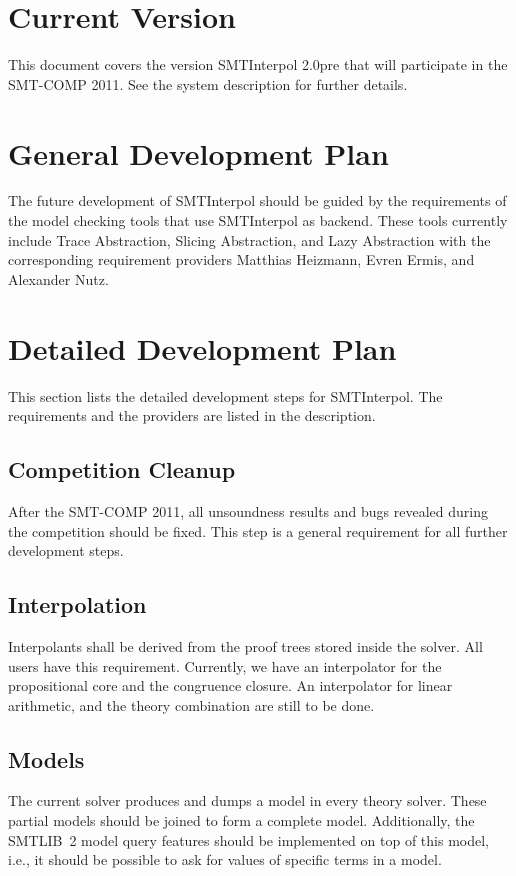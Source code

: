 \documentclass{article}
\title{\SI\ - Development Plan}
\author{J\"urgen Christ, Jochen Hoenicke\\
  University of Freiburg\\
  \texttt{\{christj,hoenicke\}@informatik.uni-freiburg.de}}
\newcommand\SI{SMTInterpol\xspace}
\newcommand\version{2.0pre\xspace}
\begin{document}
\maketitle
\section{Current Version}
This document covers the version \SI \version that will participate in the
SMT-COMP 2011.  See the system description for further details.

\section{General Development Plan}
The future development of \SI should be guided by the requirements of the
model checking tools that use \SI as backend.  These tools currently include
Trace Abstraction, Slicing Abstraction, and Lazy Abstraction with the
corresponding requirement providers Matthias Heizmann, Evren Ermis, and
Alexander Nutz.

\section{Detailed Development Plan}
This section lists the detailed development steps for \SI.  The requirements
and the providers are listed in the description.

\subsection{Competition Cleanup}
After the SMT-COMP 2011, all unsoundness results and bugs revealed during the
competition should be fixed.  This step is a general requirement for all
further development steps.

\subsection{Interpolation}
Interpolants shall be derived from the proof trees stored inside the solver.
All users have this requirement.  Currently, we have an interpolator for the
propositional core and the congruence closure.  An interpolator for linear
arithmetic, and the theory combination are still to be done.

\subsection{Models}
The current solver produces and dumps a model in every theory solver.  These
partial models should be joined to form a complete model.  Additionally, the
SMTLIB~2 model query features should be implemented on top of this model,
i.e., it should be possible to ask for values of specific terms in a model.
\end{document}
